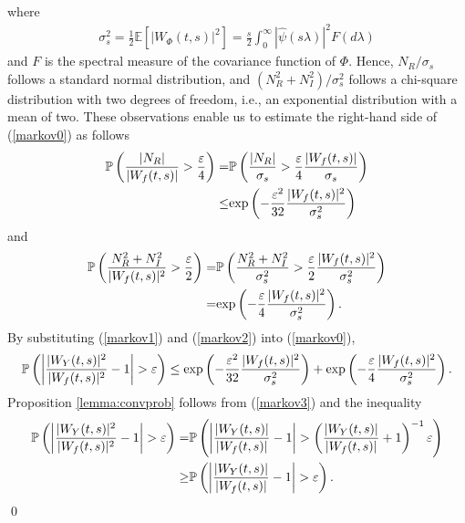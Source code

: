 \documentclass{amsart}
\begin{document}
where
\begin{align*}
\sigma_{s}^{2} = \frac{1}{2}\mathbb{E}\left[|W_{\Phi}(t,s)|^2\right]=\frac{s}{2}\int_{0}^{\infty}|\widehat{\psi}(s\lambda)|^{2}F(d\lambda)
\end{align*}
and $F$ is the spectral measure of the covariance function of $\Phi$.
Hence,  $N_{R}/\sigma_{s}$ follows a standard normal distribution,
and $(N^{2}_{R}+N^{2}_{I})/\sigma_{s}^{2}$ follows a chi-square distribution with two degrees of freedom, i.e., an exponential distribution with a mean of two.
These observations enable us to estimate the right-hand side of (\ref{markov0}) as follows
\begin{align}\notag
 \mathbb{P}\left(\frac{|N_{R}|}{|W_{f}(t,s)|}>\frac{\varepsilon}{4}\right)
=&\mathbb{P}\left(\frac{|N_{R}|}{\sigma_{s}}>\frac{\varepsilon}{4}\frac{|W_{f}(t,s)|}{\sigma_{s}}\right)
\\\label{markov1}\leq& \textup{exp}\left(-\frac{\varepsilon^{2}}{32}\frac{|W_{f}(t,s)|^{2}}{\sigma_{s}^{2}}\right)
\end{align}
and
\begin{align}\notag
\mathbb{P}\left(\frac{N^{2}_{R}+N^{2}_{I}}{|W_{f}(t,s)|^{2}}>\frac{\varepsilon}{2}\right)
=&\mathbb{P}\left(\frac{N^{2}_{R}+N^{2}_{I}}{\sigma_{s}^{2}}>\frac{\varepsilon}{2}\frac{|W_{f}(t,s)|^{2}}{\sigma_{s}^{2}}\right)
\\\label{markov2}=&\textup{exp}\left(-\frac{\varepsilon}{4}\frac{|W_{f}(t,s)|^{2}}{\sigma_{s}^{2}}\right).
\end{align}
By substituting (\ref{markov1}) and (\ref{markov2}) into (\ref{markov0}),
\begin{align}\label{markov3}
\mathbb{P}\left(\left|\frac{|W_{Y}(t,s)|^2}{|W_{f}(t,s)|^2}-1\right|>\varepsilon\right)
\leq\textup{exp}\left(-\frac{\varepsilon^{2}}{32}\frac{|W_{f}(t,s)|^{2}}{\sigma_{s}^{2}}\right)
+
\textup{exp}\left(-\frac{\varepsilon}{4}\frac{|W_{f}(t,s)|^{2}}{\sigma_{s}^{2}}\right).
\end{align}
Proposition \ref{lemma:convprob} follows from (\ref{markov3})
and the inequality
\begin{align}\notag
\mathbb{P}\left(\left|\frac{|W_{Y}(t,s)|^2}{|W_{f}(t,s)|^2}-1\right|>\varepsilon\right)
=&\mathbb{P}\left(\left|\frac{|W_{Y}(t,s)|}{|W_{f}(t,s)|}-1\right|>
\left(\frac{|W_{Y}(t,s)|}{|W_{f}(t,s)|}+1\right)^{-1}\varepsilon\right)
\\\notag\geq&\mathbb{P}\left(\left|\frac{|W_{Y}(t,s)|}{|W_{f}(t,s)|}-1\right|>
\varepsilon\right).
\end{align}
\qed
\end{document}
